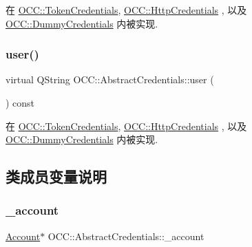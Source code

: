 在 \hyperlink{class_o_c_c_1_1_token_credentials_a6d0a8caf7e4b1b7f54890301cb7e30ef}{O\+C\+C\+::\+Token\+Credentials}, \hyperlink{class_o_c_c_1_1_http_credentials_aa3b307bb0e1bd48b5bc55aa9f096d733}{O\+C\+C\+::\+Http\+Credentials} , 以及 \hyperlink{class_o_c_c_1_1_dummy_credentials_ad5076e854fcbf690689da685002a01a0}{O\+C\+C\+::\+Dummy\+Credentials} 内被实现.

\mbox{\label{class_o_c_c_1_1_abstract_credentials_a8d96306a2d4af6c6dcffaa0b7c5b46f8}} 
\subsubsection{\texorpdfstring{user()}{user()}}
{\footnotesize\ttfamily virtual Q\+String O\+C\+C\+::\+Abstract\+Credentials\+::user (\begin{DoxyParamCaption}{ }\end{DoxyParamCaption}) const\hspace{0.3cm}{\ttfamily [pure virtual]}}



在 \hyperlink{class_o_c_c_1_1_token_credentials_ab431dd443d32749da91f05f490a9e896}{O\+C\+C\+::\+Token\+Credentials}, \hyperlink{class_o_c_c_1_1_http_credentials_a017bf9144c7659f777b9aabc98e03987}{O\+C\+C\+::\+Http\+Credentials} , 以及 \hyperlink{class_o_c_c_1_1_dummy_credentials_a98ae82a333546d10928308dd31b78cf6}{O\+C\+C\+::\+Dummy\+Credentials} 内被实现.



\subsection{类成员变量说明}
\mbox{\label{class_o_c_c_1_1_abstract_credentials_a40dc661c4b0f5852af9e29464ef164d1}} 
\subsubsection{\texorpdfstring{\+\_\+account}{\_account}}
{\footnotesize\ttfamily \hyperlink{class_o_c_c_1_1_account}{Account}$\ast$ O\+C\+C\+::\+Abstract\+Credentials\+::\+\_\+account\hspace{0.3cm}{\ttfamily [protected]}}



